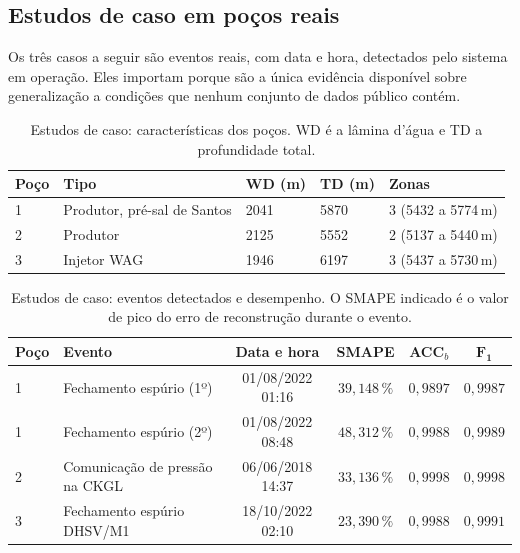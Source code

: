 \subsection{Estudos de caso em poços reais}

Os três casos a seguir são eventos reais, com data e hora, detectados pelo sistema em
operação. Eles importam porque são a única evidência disponível sobre generalização a
condições que nenhum conjunto de dados público contém.

\begin{table}[htbp]
\centering
\caption{Estudos de caso: características dos poços. WD é a lâmina d'água e TD a
profundidade total.}
\label{tab:dual-pocos}
\small
\begin{tabular}{lllll}
\toprule
\textbf{Poço} & \textbf{Tipo} & \textbf{WD (m)} & \textbf{TD (m)} & \textbf{Zonas} \\
\midrule
1 & Produtor, pré-sal de Santos & \num{2041} & \num{5870} & 3 (\num{5432} a \num{5774}\,m) \\
2 & Produtor                    & \num{2125} & \num{5552} & 2 (\num{5137} a \num{5440}\,m) \\
3 & Injetor WAG                 & \num{1946} & \num{6197} & 3 (\num{5437} a \num{5730}\,m) \\
\bottomrule
\end{tabular}
\end{table}

\begin{table}[htbp]
\centering
\caption{Estudos de caso: eventos detectados e desempenho. O SMAPE indicado é o valor de
pico do erro de reconstrução durante o evento.}
\label{tab:dual-casos}
\small
\begin{tabular}{llcccc}
\toprule
\textbf{Poço} & \textbf{Evento} & \textbf{Data e hora} & \textbf{SMAPE} &
\textbf{ACC}$_b$ & $\bm{F_1}$ \\
\midrule
1 & Fechamento espúrio (1º) & 01/08/2022 01:16 & $39{,}148\,\%$ & $0{,}9897$ & $0{,}9987$ \\
1 & Fechamento espúrio (2º) & 01/08/2022 08:48 & $48{,}312\,\%$ & $0{,}9988$ & $0{,}9989$ \\
2 & Comunicação de pressão na CKGL & 06/06/2018 14:37 & $33{,}136\,\%$ & $0{,}9998$ & $0{,}9998$ \\
3 & Fechamento espúrio DHSV/M1 & 18/10/2022 02:10 & $23{,}390\,\%$ & $0{,}9988$ & $0{,}9991$ \\
\bottomrule
\end{tabular}
\end{table}

